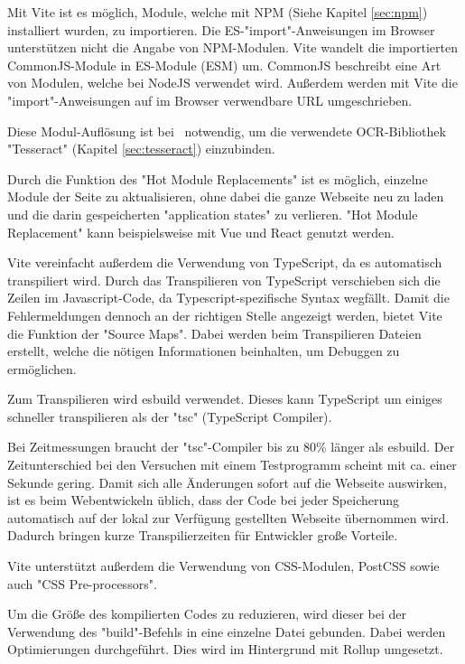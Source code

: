 

Mit Vite ist es möglich, Module, welche mit NPM (Siehe Kapitel \ref{sec:npm}) installiert wurden, zu importieren. 
Die ES-"import"-Anweisungen im Browser unterstützen nicht die Angabe von NPM-Modulen. Vite wandelt die importierten CommonJS-Module in ES-Module (ESM) um. CommonJS beschreibt eine Art von Modulen, welche bei NodeJS verwendet wird. Außerdem werden mit Vite die "import"-Anweisungen auf im Browser verwendbare URL umgeschrieben. \cite{ViteFeatures}


Diese Modul-Auflösung ist bei \ZELIA\ notwendig, um die verwendete OCR-Bibliothek "Tesseract" (Kapitel \ref{sec:tesseract}) einzubinden. 


Durch die Funktion des "Hot Module Replacements" ist es möglich, einzelne Module der Seite zu aktualisieren, ohne dabei die ganze Webseite neu zu laden und die darin gespeicherten "application states" zu verlieren. "Hot Module Replacement" kann beispielsweise mit Vue und React genutzt werden. \cite{ViteFeatures}
  

Vite vereinfacht außerdem die Verwendung von TypeScript, da es automatisch transpiliert wird. 
Durch das Transpilieren von TypeScript verschieben sich die Zeilen im Javascript-Code, da Typescript-spezifische Syntax wegfällt. 
Damit die Fehler\-meldungen dennoch an der richtigen Stelle angezeigt werden, bietet Vite die Funktion der "Source Maps". 
Dabei werden beim Transpilieren Dateien erstellt, welche die nötigen Informationen beinhalten, um Debuggen zu ermöglichen.

Zum Transpilieren wird esbuild\cite{esbuild} verwendet. Dieses kann TypeScript um einiges schneller transpilieren als der "tsc" (TypeScript Compiler). \cite{ViteFeatures}

Bei Zeitmessungen braucht der "tsc"-Compiler bis zu 80\% länger als esbuild. Der Zeitunterschied bei den Versuchen mit einem Testprogramm scheint mit ca. einer Sekunde gering. 
Damit sich alle Änderungen sofort auf die Webseite auswirken, ist es beim Web\-entwickeln üblich, dass der Code bei jeder Speicherung automatisch auf der lokal zur Verfügung gestellten Webseite übernommen wird. Dadurch bringen kurze Transpilierzeiten für Entwickler große Vorteile. 


Vite unterstützt außerdem die Verwendung von CSS-Modulen, PostCSS sowie auch "CSS Pre-processors". \cite{ViteFeatures}


Um die Größe des kompilierten Codes zu reduzieren, wird dieser bei der Verwendung des "build"-Befehls in eine einzelne Datei gebunden. Dabei werden Optimierungen durchgeführt. Dies wird im Hintergrund mit Rollup \cite{Rollup} umgesetzt. 


    
    

